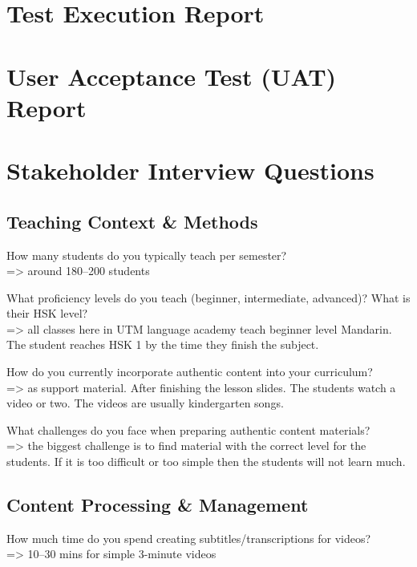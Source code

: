\documentclass[oneside]{utmthesis}
\begin{document}
\chapter{Test Execution Report}\label{app:test-execution-report}


\chapter{User Acceptance Test (UAT) Report}\label{app:uat-report}


\chapter{Stakeholder Interview Questions}\label{app:stakeholder-interview-questions}


\section{Teaching Context \& Methods}
\noindent How many students do you typically teach per semester?\\
=\textgreater{} around 180–200 students


\noindent What proficiency levels do you teach (beginner, intermediate, advanced)? What is their HSK level?\\
=\textgreater{} all classes here in UTM language academy teach beginner level Mandarin. The student reaches HSK 1 by the time they finish the subject.

\noindent How do you currently incorporate authentic content into your curriculum? \\
=\textgreater{} as support material. After finishing the lesson slides. The students watch a video or two. The videos are usually kindergarten songs.

\noindent What challenges do you face when preparing authentic content materials?\\
=\textgreater{} the biggest challenge is to find material with the correct level for the students. If it is too difficult or too simple then the students will not learn much.

\section{Content Processing \& Management}
\noindent  How much time do you spend creating subtitles/transcriptions for videos?\\
=\textgreater{} 10–30 mins for simple 3-minute videos
\end{document}
